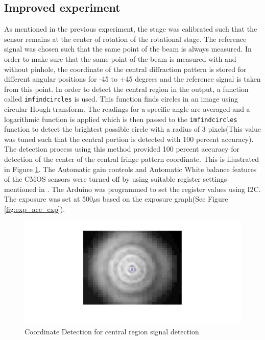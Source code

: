 \subsection{Improved experiment}
As mentioned in the previous experiment, the stage was calibrated such that the sensor remains at the center of rotation of the rotational stage. The reference signal was chosen such that the same point of the beam is always measured. In order to make sure that the same point of the beam is measured with and without pinhole, the coordinate of the central diffraction pattern is stored for different angular positions for -45 to +45 degrees and the reference signal is taken from this point. In order to detect the central region in the output, a function called \texttt{imfindcircles} is used\cite{imfindcircles}. This function finds circles in an image using circular Hough transform. The readings for a specific angle are averaged and a logarithmic function is applied which is then passed to the \texttt{imfindcircles} function to detect the brightest possible circle with a radius of 3 pixels(This value was tuned such that the central portion is detected with 100 percent accuracy). The detection process using this method provided 100 percent accuracy for detection of the center of the central fringe pattern coordinate. This is illustrated in Figure \ref{fig:center_calib}. The Automatic gain controls and Automatic White balance features of the CMOS sensors were turned off by using suitable register settings mentioned in \cite{OV2640DS}. The Arduino was programmed to set the register values using I2C. The exposure was set at 500$\mu$s based on the exposure graph(See Figure \ref{fig:exp_acc_exp}).
\begin{figure}[!h]
\centering
\includegraphics[scale=0.300]{pics/CentralRegionTracking.jpg}
\caption{Coordinate Detection for central region signal detection}
\label{fig:center_calib}
\end{figure}

